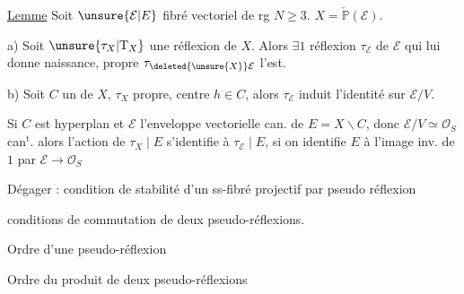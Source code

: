
\uline{Lemme} Soit $\unsure{\mathcal E|E}$ fibré vectoriel de rg $N\geq3$. $X=\check{\mathbb P}(\mathcal E)$.

a) Soit $\unsure{\tau_X|\mathrm T_X}$ une réflexion de $X$. Alors $\exists1$ réflexion $\tau_{\mathcal E}$ de $\mathcal E$ qui lui donne naissance, propre  $\tau_{\deleted{\unsure{X}}\mathcal E}$ l'est.

b) Soit $C$ un   de $X$,    $\tau_X$ propre, centre $h\in C$,  alors  $\tau_{\mathcal E}$ induit l'identité sur $\mathcal E/V$.

Si $C$ est hyperplan et $\mathcal E$ l'enveloppe vectorielle can. de $E=X\smallsetminus C$, donc $\mathcal E/V\simeq\mathcal O_S$ can$^{\mathrm t}$. alors l'action de $\tau_X\mid E$  s'identifie à $\tau_{\mathcal E}\mid E$, si on identifie $E$ à l'image inv. de $1$ par $\mathcal E\longrightarrow\mathcal O_S$

Dégager : condition de stabilité d'un ss-fibré projectif par pseudo réflexion

conditions de commutation de deux pseudo-réflexions.

Ordre d'une pseudo-réflexion

Ordre du produit de deux pseudo-réflexions

